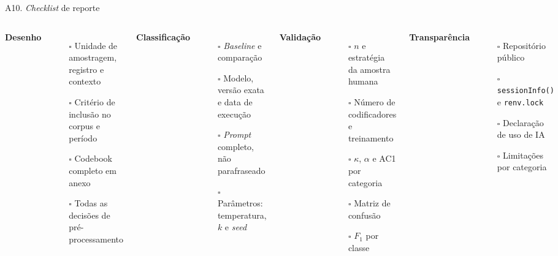 \documentclass[11pt,aspectratio=169]{beamer}
\begin{document}
\begin{frame}{A10. \emph{Checklist} de reporte}
\begin{columns}[T]
\textbf{Desenho}
\begin{itemize}\scriptsize
  \item[$\square$] Unidade de amostragem, registro e contexto
  \item[$\square$] Critério de inclusão no corpus e período
  \item[$\square$] Codebook completo em anexo
  \item[$\square$] Todas as decisões de pré-processamento
\end{itemize}
\vspace{0.15cm}
\textbf{Classificação}
\begin{itemize}\scriptsize
  \item[$\square$] \emph{Baseline} e comparação
  \item[$\square$] Modelo, versão exata e data de execução
  \item[$\square$] \emph{Prompt} completo, não parafraseado
  \item[$\square$] Parâmetros: temperatura, $k$ e \emph{seed}
\end{itemize}
\textbf{Validação}
\begin{itemize}\scriptsize
  \item[$\square$] $n$ e estratégia da amostra humana
  \item[$\square$] Número de codificadores e treinamento
  \item[$\square$] $\kappa$, $\alpha$ e AC1 por categoria
  \item[$\square$] Matriz de confusão
  \item[$\square$] $F_1$ por classe
\end{itemize}
\vspace{0.15cm}
\textbf{Transparência}
\begin{itemize}\scriptsize
  \item[$\square$] Repositório público
  \item[$\square$] \texttt{sessionInfo()} e \texttt{renv.lock}
  \item[$\square$] Declaração de uso de IA
  \item[$\square$] Limitações por categoria
\end{itemize}
\end{columns}
\end{frame}
\end{document}
